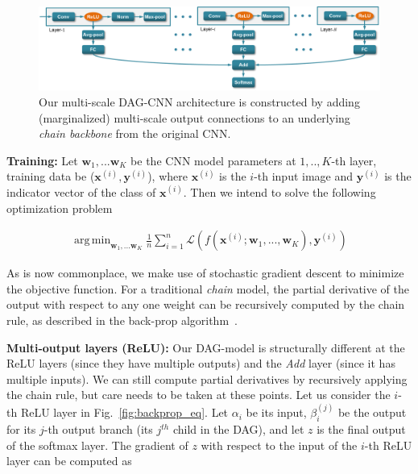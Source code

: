 \documentclass[10pt,twocolumn,letterpaper]{article}
\DeclareMathOperator*{\argmin}{arg\,min}
\begin{document}

\begin{figure}[t!]
\centering
	\includegraphics[width=\textwidth]{fig/fig_model.png}
\caption{Our multi-scale DAG-CNN architecture is constructed by adding (marginalized) multi-scale output connections to an underlying {\em chain backbone} from the original CNN.}
\label{fig:model}
\end{figure}

{\bf Training:} Let $\textbf{w}_1,...\textbf{w}_K$ be the CNN model parameters at $1,..,K$-th layer, training data be ($\textbf{x}^{(i)},\textbf{y}^{(i)}$), where $\textbf{x}^{(i)}$ is the $i$-th input image and $\textbf{y}^{(i)}$ is the indicator vector of the class of $\textbf{x}^{(i)}$. Then we intend to solve the following optimization problem

\begin{align}
\argmin_{\textbf{w}_1,...\textbf{w}_K} \frac{1}{n}\sum_{i=1}^{n} \mathcal{L}(f(\textbf{x}^{(i)};\textbf{w}_1,...,\textbf{w}_K),\textbf{y}^{(i)})
\end{align}

As is now commonplace, we make use of stochastic gradient descent to minimize the objective function. For a traditional \textit{chain} model, the partial derivative of the output with respect to any one weight can be recursively computed by the chain rule, as described in the back-prop algorithm~\cite{rumelhart1988learning}. 

{\bf Multi-output layers (ReLU):} Our DAG-model is structurally different at the ReLU layers (since they have multiple outputs) and the \textit{Add} layer (since it has multiple inputs). We can still compute partial derivatives by recursively applying the chain rule, but care needs to be taken at these points. Let us consider the $i$-th ReLU layer in Fig.~\ref{fig:backprop_eq}. Let $\alpha_i$ be its input, $\beta_i^{(j)}$ be the output for its $j$-th output branch (its $j^{th}$ child in the DAG), and let $z$ is the final output of the softmax layer. The gradient of $z$ with respect to the input of the $i$-th ReLU layer can be computed as
\end{document}
